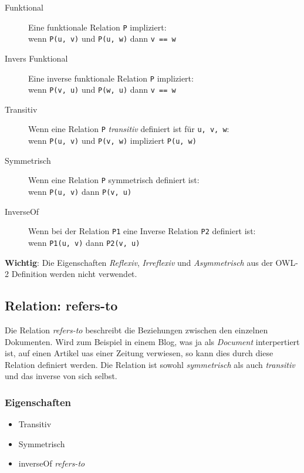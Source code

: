 ﻿\documentclass[
    11pt,
    latin1,
    a4paper,
    oneside
]{scrreprt}
\begin{document}
\begin{description}
	\item[Funktional] Eine funktionale Relation \texttt{P} impliziert: \\
		wenn \texttt{P(u, v)} und \texttt{P(u, w)} dann \texttt{v == w}
	\item[Invers Funktional] Eine inverse funktionale Relation \texttt{P} impliziert: \\
		wenn \texttt{P(v, u)} und \texttt{P(w, u)} dann \texttt{v == w}
	\item[Transitiv] Wenn eine Relation \texttt{P} \emph{transitiv} definiert ist f\"ur \texttt{u, v, w}: \\
		wenn \texttt{P(u, v)} und \texttt{P(v, w)} impliziert \texttt{P(u, w)}
	\item[Symmetrisch] Wenn eine Relation \texttt{P} symmetrisch definiert ist: \\
		wenn \texttt{P(u, v)} dann \texttt{P(v, u)}
	\item[InverseOf] Wenn bei der Relation \texttt{P1} eine Inverse Relation \texttt{P2} definiert ist:\\
		wenn \texttt{P1(u, v)} dann \texttt{P2(v, u)}
\end{description}

\textbf{Wichtig}: Die Eigenschaften \emph{Reflexiv}, \emph{Irreflexiv} und \emph{Asymmetrisch} aus der OWL-2 Definition werden nicht verwendet.


\subsection{Relation: refers-to} \label{sec:rel_refersto}

Die Relation \emph{refers-to} beschreibt die Beziehungen zwischen den einzelnen Dokumenten. Wird zum Beispiel in einem Blog, was ja als \emph{Document} interpertiert ist, auf einen Artikel uas einer Zeitung verwiesen, so kann dies durch diese Relation definiert werden. Die Relation ist sowohl \emph{symmetrisch} als auch \emph{transitiv} und das inverse von sich selbst.

\subsubsection{Eigenschaften} \label{sec:rel_refersto_settings}

\begin{itemize}
	\item Transitiv
	\item Symmetrisch
	\item inverseOf \emph{refers-to}
\end{itemize}
\end{document}
